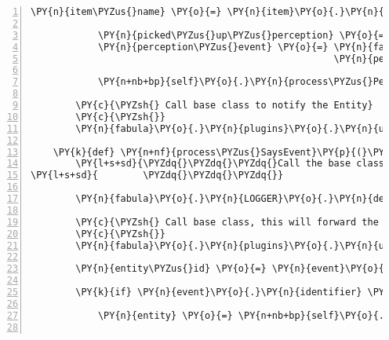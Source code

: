 \begin{Verbatim}[commandchars=\\\{\},numbers=left,firstnumber=1,stepnumber=1]
                \PY{n}{item\PYZus{}name} \PY{o}{=} \PY{n}{item}\PY{o}{.}\PY{n}{assets}\PY{p}{[}\PY{l+s}{\PYZsq{}}\PY{l+s}{text/plain}\PY{l+s}{\PYZsq{}}\PY{p}{]}\PY{o}{.}\PY{n}{data}\PY{p}{[}\PY{l+m+mi}{0}\PY{p}{]}

            \PY{n}{picked\PYZus{}up\PYZus{}perception} \PY{o}{=} \PY{n+nb+bp}{self}\PY{o}{.}\PY{n}{in\PYZus{}inventory\PYZus{}msg}\PY{o}{.}\PY{n}{format}\PY{p}{(}\PY{n}{item\PYZus{}name}\PY{p}{)}
            \PY{n}{perception\PYZus{}event} \PY{o}{=} \PY{n}{fabula}\PY{o}{.}\PY{n}{PerceptionEvent}\PY{p}{(}\PY{n}{identifier}\PY{o}{=}\PY{n+nb+bp}{self}\PY{o}{.}\PY{n}{host}\PY{o}{.}\PY{n}{client\PYZus{}id}\PY{p}{,}
                                                      \PY{n}{perception}\PY{o}{=}\PY{n}{picked\PYZus{}up\PYZus{}perception}\PY{p}{)}

            \PY{n+nb+bp}{self}\PY{o}{.}\PY{n}{process\PYZus{}PerceptionEvent}\PY{p}{(}\PY{n}{perception\PYZus{}event}\PY{p}{)}

        \PY{c}{\PYZsh{} Call base class to notify the Entity}
        \PY{c}{\PYZsh{}}
        \PY{n}{fabula}\PY{o}{.}\PY{n}{plugins}\PY{o}{.}\PY{n}{ui}\PY{o}{.}\PY{n}{UserInterface}\PY{o}{.}\PY{n}{process\PYZus{}PicksUpEvent}\PY{p}{(}\PY{n+nb+bp}{self}\PY{p}{,} \PY{n}{event}\PY{p}{)}

    \PY{k}{def} \PY{n+nf}{process\PYZus{}SaysEvent}\PY{p}{(}\PY{n+nb+bp}{self}\PY{p}{,} \PY{n}{event}\PY{p}{)}\PY{p}{:}
        \PY{l+s+sd}{\PYZdq{}\PYZdq{}\PYZdq{}Call the base class, then present the text to the user and wait some time.}
\PY{l+s+sd}{        \PYZdq{}\PYZdq{}\PYZdq{}}

        \PY{n}{fabula}\PY{o}{.}\PY{n}{LOGGER}\PY{o}{.}\PY{n}{debug}\PY{p}{(}\PY{l+s}{\PYZdq{}}\PY{l+s}{called}\PY{l+s}{\PYZdq{}}\PY{p}{)}

        \PY{c}{\PYZsh{} Call base class, this will forward the event to the Entity.}
        \PY{c}{\PYZsh{}}
        \PY{n}{fabula}\PY{o}{.}\PY{n}{plugins}\PY{o}{.}\PY{n}{ui}\PY{o}{.}\PY{n}{UserInterface}\PY{o}{.}\PY{n}{process\PYZus{}SaysEvent}\PY{p}{(}\PY{n+nb+bp}{self}\PY{p}{,} \PY{n}{event}\PY{p}{)}

        \PY{n}{entity\PYZus{}id} \PY{o}{=} \PY{n}{event}\PY{o}{.}\PY{n}{identifier}

        \PY{k}{if} \PY{n}{event}\PY{o}{.}\PY{n}{identifier} \PY{o+ow}{in} \PY{n+nb+bp}{self}\PY{o}{.}\PY{n}{host}\PY{o}{.}\PY{n}{room}\PY{o}{.}\PY{n}{entity\PYZus{}dict}\PY{o}{.}\PY{n}{keys}\PY{p}{(}\PY{p}{)}\PY{p}{:}

            \PY{n}{entity} \PY{o}{=} \PY{n+nb+bp}{self}\PY{o}{.}\PY{n}{host}\PY{o}{.}\PY{n}{room}\PY{o}{.}\PY{n}{entity\PYZus{}dict}\PY{p}{[}\PY{n}{event}\PY{o}{.}\PY{n}{identifier}\PY{p}{]}


\end{Verbatim}
